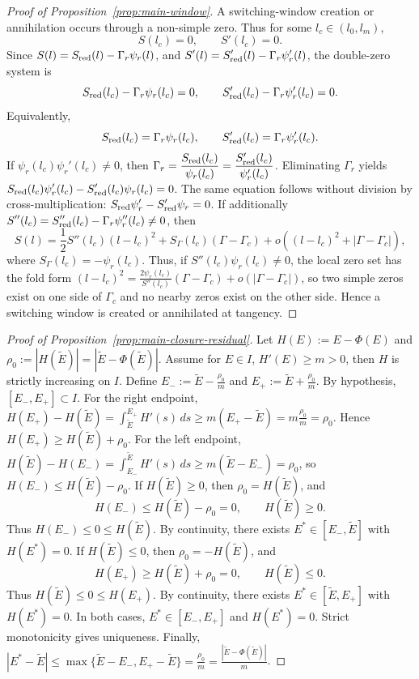 \documentclass[pdflatex,sn-mathphys-num]{sn-jnl}
\theoremstyle{thmstyleone}
\theoremstyle{definition}
\theoremstyle{remark}
\newcommand{\abs}[1]{\left\lvert#1\right\rvert}
\numberwithin{equation}{section}
\begin{document}
\begin{proof}[Proof of Proposition~\ref{prop:main-window}]
A switching-window creation or annihilation occurs through a non-simple zero.
Thus for some \(l_c\in(l_0,l_m)\),
\[
S(l_c)=0,
\qquad
S'(l_c)=0.
\]
Since
$\displaystyle 
S(l)=S_{\rm red}(l)-\Gamma_r\psi_r(l)$,
and
$\displaystyle 
S'(l)=S_{\rm red}'(l)-\Gamma_r\psi_r'(l)$,
the double-zero system is
\[
S_{\rm red}(l_c)-\Gamma_r\psi_r(l_c)=0,
\qquad
S_{\rm red}'(l_c)-\Gamma_r\psi_r'(l_c)=0.
\]
Equivalently,
\[
S_{\rm red}(l_c)=\Gamma_r\psi_r(l_c),
\qquad
S_{\rm red}'(l_c)=\Gamma_r\psi_r'(l_c).
\]
If
$\displaystyle 
\psi_r(l_c)\psi_r'(l_c)\ne0$,
then
$\displaystyle 
\Gamma_r
=
\frac{S_{\rm red}(l_c)}{\psi_r(l_c)}
=
\frac{S_{\rm red}'(l_c)}{\psi_r'(l_c)}$.
Eliminating \(\Gamma_r\) yields
$\displaystyle 
S_{\rm red}(l_c)\psi_r'(l_c)
-
S_{\rm red}'(l_c)\psi_r(l_c)
=
0$.
The same equation follows without division by cross-multiplication:
$\displaystyle 
S_{\rm red}\psi_r'-S_{\rm red}'\psi_r=0$.
If additionally
$\displaystyle 
S''(l_c)
=
S_{\rm red}''(l_c)-\Gamma_r\psi_r''(l_c)
\ne0$,
then
\[
S(l)
=
\frac12S''(l_c)(l-l_c)^2
+
S_\Gamma(l_c)(\Gamma-\Gamma_c)
+
o((l-l_c)^2+\abs{\Gamma-\Gamma_c}),
\]
where
$\displaystyle 
S_\Gamma(l_c)=-\psi_r(l_c)$.
Thus, if
$\displaystyle 
S''(l_c)\psi_r(l_c)\ne0$,
the local zero set has the fold form
$\displaystyle 
(l-l_c)^2
=
\frac{2\psi_r(l_c)}{S''(l_c)}
(\Gamma-\Gamma_c)
+
o(\abs{\Gamma-\Gamma_c})$,
so two simple zeros exist on one side of \(\Gamma_c\) and no nearby zeros exist on
the other side. Hence a switching window is created or annihilated at tangency.
\end{proof}
\begin{proof}[Proof of Proposition~\ref{prop:main-closure-residual}]
Let
$\displaystyle 
H(E):=E-\Phi(E)$ and
$\displaystyle 
\rho_0:=\abs{H(\tilde E)}
=
\abs{\tilde E-\Phi(\tilde E)}$.
Assume for $E\in I$,
$H'(E)\ge m>0$, then \(H\) is strictly increasing on \(I\).
Define
$\displaystyle 
E_-:=\tilde E-\frac{\rho_0}{m}$ and
$\displaystyle 
E_+:=\tilde E+\frac{\rho_0}{m}$.
By hypothesis,
$\displaystyle 
[E_-,E_+]\subset I$.
For the right endpoint,
$\displaystyle 
H(E_+)-H(\tilde E)
=
\int_{\tilde E}^{E_+}H'(s)\,ds
\ge
m(E_+-\tilde E)
=
m\frac{\rho_0}{m}
=
\rho_0$.
Hence
$\displaystyle 
H(E_+)\ge H(\tilde E)+\rho_0$.
For the left endpoint,
$\displaystyle 
H(\tilde E)-H(E_-)
=
\int_{E_-}^{\tilde E}H'(s)\,ds
\ge
m(\tilde E-E_-)
=
\rho_0$,
so
$\displaystyle 
H(E_-)\le H(\tilde E)-\rho_0$.
If
$\displaystyle 
H(\tilde E)\ge0$,
then
$\displaystyle 
\rho_0=H(\tilde E)$,
and
\[
H(E_-)\le H(\tilde E)-\rho_0=0,
\qquad
H(\tilde E)\ge0.
\]
Thus
$\displaystyle 
H(E_-)\le0\le H(\tilde E)$.
By continuity, there exists
$\displaystyle 
E^*\in[E_-,\tilde E]$
with
$\displaystyle 
H(E^*)=0$.
If
$\displaystyle 
H(\tilde E)\le0$,
then
$\displaystyle 
\rho_0=-H(\tilde E)$,
and
\[
H(E_+)\ge H(\tilde E)+\rho_0=0,
\qquad
H(\tilde E)\le0.
\]
Thus
$\displaystyle 
H(\tilde E)\le0\le H(E_+)$.
By continuity, there exists
$\displaystyle 
E^*\in[\tilde E,E_+]$
with
$\displaystyle 
H(E^*)=0$.
In both cases,
$\displaystyle 
E^*\in[E_-,E_+]$ and
$\displaystyle 
H(E^*)=0$.
Strict monotonicity gives uniqueness. Finally,
$\displaystyle 
\abs{E^*-\tilde E}
\le
\max\{\tilde E-E_-,E_+-\tilde E\}
=
\frac{\rho_0}{m}
=
\frac{\abs{\tilde E-\Phi(\tilde E)}}{m}$.
\end{proof}
\end{document}
